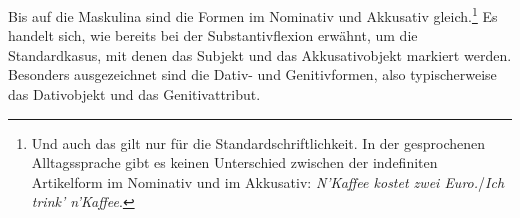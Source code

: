 \begin{table}
  \centering
  \caption{Paradigma des definiten und indefiniten Artikels in der Substantivgruppe}
  \label{tab:def_indef_Art}
\end{table}

Bis auf die Maskulina sind die Formen im Nominativ und Akkusativ gleich.\footnote{Und auch das gilt nur für die Standardschriftlichkeit. In der gesprochenen Alltagssprache gibt es keinen Unterschied zwischen der indefiniten Artikelform im Nominativ und im Akkusativ: \textit{N'Kaffee kostet zwei Euro.}/\textit{Ich trink' n'Kaffee}.} Es handelt sich, wie bereits bei der Substantivflexion erwähnt, um die Standardkasus, mit denen das Subjekt und das Akkusativobjekt markiert werden. Besonders ausgezeichnet sind die Dativ- und Genitivformen, also typischerweise das Dativobjekt und das Genitivattribut.

